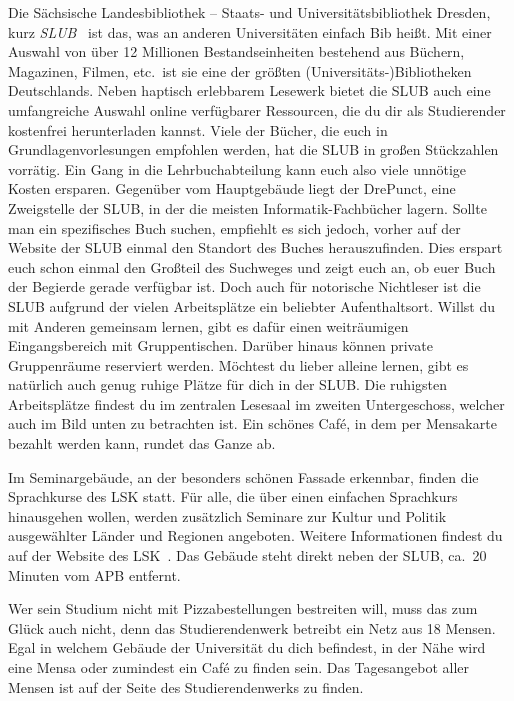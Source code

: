 \label{sec:slub}
Die Sächsische Landesbibliothek – Staats- und Universitätsbibliothek Dresden, kurz \emph{SLUB}~ ist das, was an anderen Universitäten einfach Bib heißt.
Mit einer Auswahl von über 12 Millionen Bestandseinheiten bestehend aus Büchern, Magazinen, Filmen, etc.\ ist sie eine der größten (Universitäts-)Bibliotheken Deutschlands.
Neben haptisch erlebbarem Lesewerk bietet die SLUB auch eine umfangreiche Auswahl online verfügbarer Ressourcen, die du dir als Studierender kostenfrei herunterladen kannst.
Viele der Bücher, die euch in Grundlagenvorlesungen empfohlen werden, hat die SLUB in großen Stückzahlen vorrätig. Ein Gang in die Lehrbuchabteilung kann euch also viele unnötige Kosten ersparen.
Gegenüber vom Hauptgebäude liegt der DrePunct, eine Zweigstelle der SLUB, in der die meisten Informatik-Fachbücher lagern. Sollte man ein spezifisches Buch suchen, empfiehlt es sich jedoch, vorher auf der Website der
SLUB einmal den Standort des Buches herauszufinden. Dies erspart euch schon einmal den Großteil des Suchweges und zeigt euch an, ob euer Buch der Begierde gerade verfügbar ist.\newline
Doch auch für notorische Nichtleser ist die SLUB aufgrund der vielen Arbeitsplätze ein beliebter Aufenthaltsort.
Willst du mit Anderen gemeinsam lernen, gibt es dafür einen weiträumigen Eingangsbereich mit Gruppentischen.
Darüber hinaus können private Gruppenräume reserviert werden. Möchtest du lieber alleine lernen, gibt es natürlich auch genug ruhige Plätze für dich in der SLUB. Die ruhigsten Arbeitsplätze findest du im zentralen Lesesaal
im zweiten Untergeschoss, welcher auch im Bild unten zu betrachten ist. Ein schönes Café, in dem per Mensakarte bezahlt werden kann, rundet das Ganze ab.

\newpage
{}
Im Seminargebäude, an der besonders schönen Fassade erkennbar, finden die Sprachkurse des LSK statt.
Für alle, die über einen einfachen Sprachkurs hinausgehen wollen, werden zusätzlich Seminare zur Kultur und Politik ausgewählter Länder und Regionen angeboten.
Weitere Informationen findest du auf der Website des LSK~.
Das Gebäude steht direkt neben der SLUB, ca.\ 20 Minuten vom APB entfernt.

Wer sein Studium nicht mit Pizzabestellungen bestreiten will, muss das zum Glück auch nicht, denn das Studierendenwerk betreibt ein Netz aus 18 Mensen.
Egal in welchem Gebäude der Universität du dich befindest, in der Nähe wird eine Mensa oder zumindest ein Café zu finden sein.
Das Tagesangebot aller Mensen ist auf der Seite des Studierendenwerks  zu finden.


